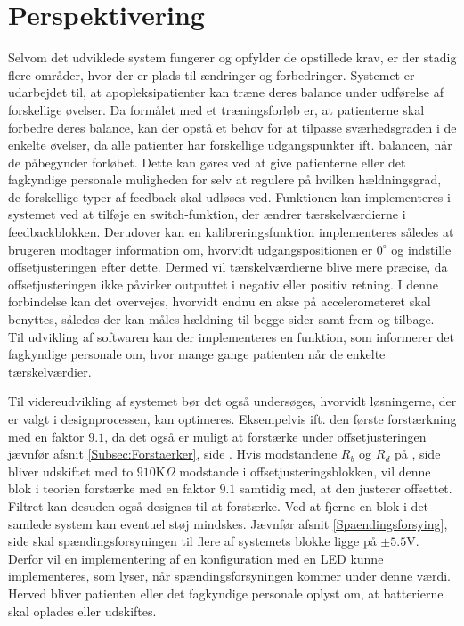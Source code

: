 \section{Perspektivering}
Selvom det udviklede system fungerer og opfylder de opstillede krav, er der stadig flere områder, hvor der er plads til ændringer og forbedringer. 
Systemet er udarbejdet til, at apopleksipatienter kan træne deres balance under udførelse af forskellige øvelser. Da formålet med et træningsforløb er, at patienterne skal forbedre deres balance, kan der opstå et behov for at tilpasse sværhedsgraden i de enkelte øvelser, da alle patienter har forskellige udgangspunkter ift. balancen, når de påbegynder forløbet. Dette kan gøres ved at give patienterne eller det fagkyndige personale muligheden for selv at regulere på hvilken hældningsgrad, de forskellige typer af feedback skal udløses ved. Funktionen kan implementeres i systemet ved at tilføje en switch-funktion, der ændrer tærskelværdierne i feedbackblokken. Derudover kan en kalibreringsfunktion implementeres således at brugeren modtager information om, hvorvidt udgangspositionen er $0^{\circ}$ og indstille offsetjusteringen efter dette. Dermed vil tærskelværdierne blive mere præcise, da offsetjusteringen ikke påvirker outputtet i negativ eller positiv retning. %
I denne forbindelse kan det overvejes, hvorvidt endnu en akse på accelerometeret skal benyttes, således der kan måles hældning til begge sider samt frem og tilbage. \\
Til udvikling af softwaren kan der implementeres en funktion, som informerer det fagkyndige personale om, hvor mange gange patienten når de enkelte tærskelværdier.   

Til videreudvikling af systemet bør det også undersøges, hvorvidt løsningerne, der er valgt i designprocessen, kan optimeres. Eksempelvis ift. den første forstærkning med en faktor $9.1$, da det også er muligt at forstærke under offsetjusteringen jævnfør afsnit \ref{Subsec:Forstaerker}, side \pageref{Subsec:Forstaerker}. Hvis modstandene $R_{b}$ og $R_{d}$ på , side \pageref{fig:Forstaerker_faktor18} bliver udskiftet med to $910$K$\Omega$ modstande  i offsetjusteringsblokken, vil denne blok i teorien forstærke med en faktor $9.1$ samtidig med, at den justerer offsettet. Filtret kan desuden også designes til at forstærke. Ved at fjerne en blok i det samlede system kan eventuel støj mindskes. Jævnfør afsnit \ref{Spaendingsforsying}, side \pageref{Spaendingsforsying} skal spændingsforsyningen til flere af systemets blokke ligge på $\pm5.5$V. Derfor vil en implementering af en konfiguration med en LED kunne implementeres, som lyser, når spændingsforsyningen kommer under denne værdi. Herved bliver patienten eller det fagkyndige personale oplyst om, at batterierne skal oplades eller udskiftes.

